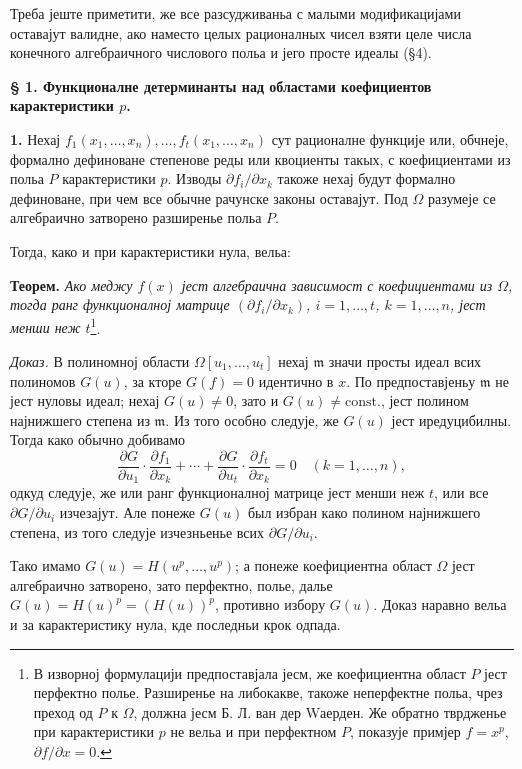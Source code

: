 \documentclass[11pt]{article}
\begin{document}
Треба јеште приметити, же все разсудживаньа с малыми модификацијами оставајут валидне, ако наместо целых рационалных чисел взяти целе числа конечного алгебраичного числового польа и јего просте идеалы (§4).

\bigskip
\noindent\textbf{§ 1. Функционалне детерминанты над областами коефициентов карактеристики \(p\).}

\smallskip
\noindent\textbf{1.}
Нехај \(f_1(x_1,\ldots,x_n),\ldots,f_t(x_1,\ldots,x_n)\) сут рационалне функције или, обчнеје, формално дефиноване степенове реды или квоциенты такых, с коефициентами из польа \(P\) карактеристики \(p\). Изводы \(\partial f_i/\partial x_k\) такоже нехај будут формално дефиноване, при чем все обычне рачунске законы оставајут. Под \(\Omega\) разумеје се алгебраично затворено разширенье польа \(P\).

Тогда, како и при карактеристики нула, вельа:

\noindent\textbf{Теорем.}
\textit{Ако меджу \(f(x)\) јест алгебраична зависимост с коефициентами из \(\Omega\), тогда ранг функционалној матрице \((\partial f_i/\partial x_k)\), \(i=1,\ldots,t\), \(k=1,\ldots,n\), јест менши неж \(t\)}\footnote{В изворној формулацији предпоставјала јесм, же коефициентна област \(P\) јест перфектно полье. Разширенье на либокакве, такоже неперфектне польа, чрез преход од \(P\) к \(\Omega\), должна јесм Б. Л. ван дер Wаерден. Же обратно тврдженье при карактеристики \(p\) не вельа и при перфектном \(P\), показује примјер \(f=x^p\), \(\partial f/\partial x=0\).}.

\noindent\textit{Доказ.}
В полиномној области \(\Omega[u_1,\ldots,u_t]\) нехај \(\mathfrak{m}\) значи просты идеал всих полиномов \(G(u)\), за кторе \(G(f)=0\) идентично в \(x\). По предпоставјеньу \(\mathfrak{m}\) не јест нуловы идеал; нехај \(G(u)\ne0\), зато и \(G(u)\ne\mathrm{const.}\), јест полином најнижшего степена из \(\mathfrak{m}\). Из того особно следује, же \(G(u)\) јест иредуцибилны. Тогда како обычно добивамо
\[
\frac{\partial G}{\partial u_1}\cdot\frac{\partial f_1}{\partial x_k}
+\cdots+
\frac{\partial G}{\partial u_t}\cdot\frac{\partial f_t}{\partial x_k}=0
\quad(k=1,\ldots,n),
\]
одкуд следује, же или ранг функционалној матрице јест менши неж \(t\), или все \(\partial G/\partial u_i\) изчезајут. Але понеже \(G(u)\) был избран како полином најнижшего степена, из того следује изчезньенье всих \(\partial G/\partial u_i\).

Тако имамо \(G(u)=H(u^p,\ldots,u^p)\); а понеже коефициентна област \(\Omega\) јест алгебраично затворено, зато перфектно, полье, далье \(G(u)=H(u)^p=(H(u))^p\), противно избору \(G(u)\). Доказ наравно вельа и за карактеристику нула, кде последньи крок одпада.
\end{document}

